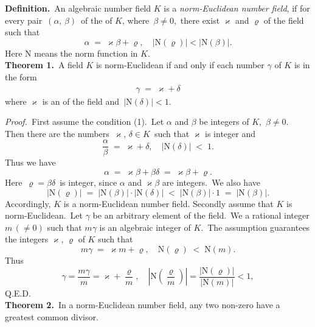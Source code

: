 \documentclass[12pt]{article}
\theoremstyle{definition}
\begin{document}
 

\textbf{Definition.}\, An algebraic number field $K$ is a {\em norm-Euclidean number field}, if for every pair\, $(\alpha,\,\beta)$\, of the  of $K$, where\, $\beta \neq 0$,\, there exist   $\varkappa$ and $\varrho$ of the field such that
$$\alpha \;=\; \varkappa\beta+\varrho, \quad |\mbox{N}(\varrho)| < |\mbox{N}(\beta)|.$$
Here $\mbox{N}$ means the norm function in $K$.\\

\textbf{Theorem 1.}\, A field $K$ is norm-Euclidean if and only if each number $\gamma$ of $K$ is  in the form
\begin{align}
\gamma \;=\; \varkappa+\delta
\end{align}
where $\varkappa$ is an  of the field and\, 
$|\mbox{N}(\delta)| < 1.$

{\em Proof.}\, First assume the condition (1).\, Let $\alpha$ and $\beta$ be integers of $K$,\, $\beta \neq 0$.\, Then there are the numbers\, $\varkappa,\,\delta \in K$\, such that $\varkappa$ is integer and
   $$\frac{\alpha}{\beta} \;=\; \varkappa+\delta, \quad |\mbox{N}(\delta)| \;<\; 1.$$
Thus we have
 $$\alpha \;=\; \varkappa\beta+\beta\delta \;=\; \varkappa\beta+\varrho.$$
Here\, $\varrho = \beta\delta$\, is integer, since $\alpha$ and $\varkappa\beta$ are integers.\, We also have
$$|\mbox{N}(\varrho)| \;=\; |\mbox{N}(\beta)|\cdot|\mbox{N}(\delta)|
\;<\; |\mbox{N}(\beta)|\cdot1 \;=\; |\mbox{N}(\beta)|.$$
Accordingly, $K$ is a norm-Euclidean number field.
Secondly assume that $K$ is norm-Euclidean.\, Let $\gamma$ be an arbitrary element of the field.\, We  a rational integer $m\,(\neq 0)$ such that $m\gamma$ is an algebraic integer of $K$.\, The assumption guarantees the integers $\varkappa$, $\varrho$ of $K$ such that
 $$m\gamma \;=\; \varkappa m+\varrho, \quad \mbox{N}(\varrho) \;<\; \mbox{N}(m).$$
Thus
 $$\gamma = \frac{m\gamma}{m} = \varkappa+\frac{\varrho}{m}, \quad
\left\vert\mbox{N} \left(\frac{\varrho}{m}\right)\right\vert = \frac{|\mbox{N}(\varrho)|}{|\mbox{N}(m)|} < 1,$$
Q.E.D.\\

\textbf{Theorem 2.}\, In a norm-Euclidean number field, any two non-zero  have a greatest common divisor.
\end{document}
